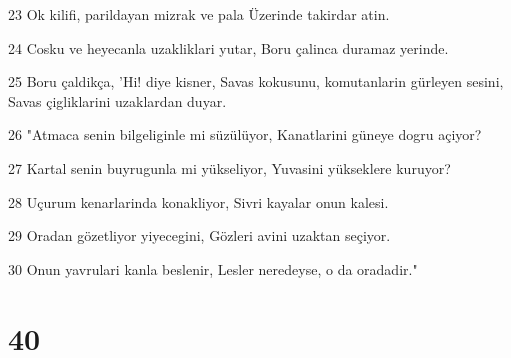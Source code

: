 \par 23 Ok kilifi, parildayan mizrak ve pala Üzerinde takirdar atin.
\par 24 Cosku ve heyecanla uzakliklari yutar, Boru çalinca duramaz yerinde.
\par 25 Boru çaldikça, 'Hi! diye kisner, Savas kokusunu, komutanlarin gürleyen sesini, Savas çigliklarini uzaklardan duyar.
\par 26 "Atmaca senin bilgeliginle mi süzülüyor, Kanatlarini güneye dogru açiyor?
\par 27 Kartal senin buyrugunla mi yükseliyor, Yuvasini yükseklere kuruyor?
\par 28 Uçurum kenarlarinda konakliyor, Sivri kayalar onun kalesi.
\par 29 Oradan gözetliyor yiyecegini, Gözleri avini uzaktan seçiyor.
\par 30 Onun yavrulari kanla beslenir, Lesler neredeyse, o da oradadir."

\chapter{40}

